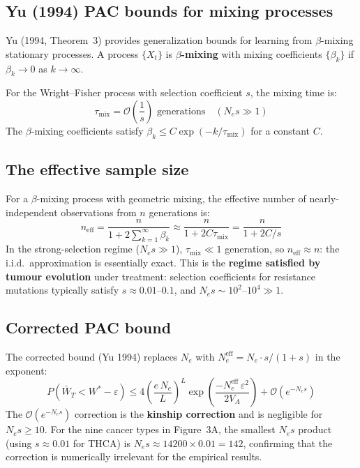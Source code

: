 \documentclass[12pt]{article}
\theoremstyle{remark}
\begin{document}
\subsection{Yu (1994) PAC bounds for mixing processes}

Yu (1994, Theorem~3) provides generalization bounds for learning from $\beta$-mixing stationary processes. A process $\{X_t\}$ is \textbf{$\beta$-mixing} with mixing coefficients $\{\beta_k\}$ if $\beta_k \to 0$ as $k \to \infty$.

For the Wright--Fisher process with selection coefficient $s$, the mixing time is:
\[
  \tau_\text{mix} = \mathcal{O}\!\left(\frac{1}{s}\right) \text{ generations} \quad (N_e s \gg 1)
\]
The $\beta$-mixing coefficients satisfy $\beta_k \leq C\exp(-k/\tau_\text{mix})$ for a constant $C$.

\subsection{The effective sample size}

For a $\beta$-mixing process with geometric mixing, the effective number of nearly-independent observations from $n$ generations is:
\[
  n_\text{eff} = \frac{n}{1 + 2\sum_{k=1}^\infty \beta_k}
  \approx \frac{n}{1 + 2C\tau_\text{mix}}
  = \frac{n}{1 + 2C/s}
\]
In the strong-selection regime ($N_e s \gg 1$), $\tau_\text{mix} \ll 1$ generation, so $n_\text{eff} \approx n$: the i.i.d.\ approximation is essentially exact. This is the \textbf{regime satisfied by tumour evolution} under treatment: selection coefficients for resistance mutations typically satisfy $s \approx 0.01$--$0.1$, and $N_e s \sim 10^2$--$10^4 \gg 1$.

\subsection{Corrected PAC bound}

The corrected bound (Yu 1994) replaces $N_e$ with $N_e^\text{eff} = N_e \cdot s / (1 + s)$ in the exponent:
\[
  P\!\left(\bar{W}_T < W^* - \varepsilon\right)
  \leq 4\left(\frac{e\,N_e}{L}\right)^L
  \exp\!\left(\frac{-N_e^\text{eff}\,\varepsilon^2}{2V_A}\right)
  + \mathcal{O}(e^{-N_e s})
\]
The $\mathcal{O}(e^{-N_e s})$ correction is the \textbf{kinship correction} and is negligible for $N_e s \geq 10$. For the nine cancer types in Figure~3A, the smallest $N_e s$ product (using $s \approx 0.01$ for THCA) is $N_e s \approx 14200 \times 0.01 = 142$, confirming that the correction is numerically irrelevant for the empirical results.
\end{document}
